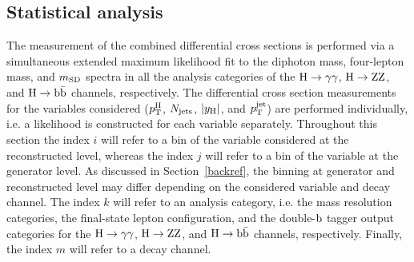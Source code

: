 \subsection{Statistical analysis}
\label{sec:stat}

The measurement of the combined differential cross sections is performed via a simultaneous extended maximum likelihood fit to the diphoton mass, four-lepton mass, and $m_\mathrm{SD}$ spectra in all the analysis categories of the $\mathrm{H}\to\mathrm{\gamma}\mathrm{\gamma}$, $\mathrm{H}\to\mathrm{Z}\mathrm{Z}$, and $\mathrm{H}\to\mathrm{b}\bar{\mathrm{b}}$ channels, respectively.
% 
The differential cross section measurements for the variables considered ($p_\mathrm{T}^\mathrm{H}$, $N_\text{jets} $, $\left|y_\mathrm{H}\right| $, and $p_\mathrm{T}^\text{jet} $) are performed individually, i.e. a likelihood is constructed for each variable separately.
% 
Throughout this section the index $i$ will refer to a bin of the variable considered at the reconstructed level, whereas the index $j$ will refer to a bin of the variable at the generator level.
% 
As discussed in Section~\ref{backref}, the binning at generator and reconstructed level may differ depending on the considered variable and decay channel.
% 
The index $k$ will refer to an analysis category, i.e. the mass resolution categories, the final-state lepton configuration, and the double-$\mathrm{b}$ tagger output categories for the $\mathrm{H}\to\mathrm{\gamma}\mathrm{\gamma}$, $\mathrm{H}\to\mathrm{Z}\mathrm{Z}$, and $\mathrm{H}\to\mathrm{b}\bar{\mathrm{b}}$ channels, respectively.
% 
Finally, the index $m$ will refer to a decay channel.


